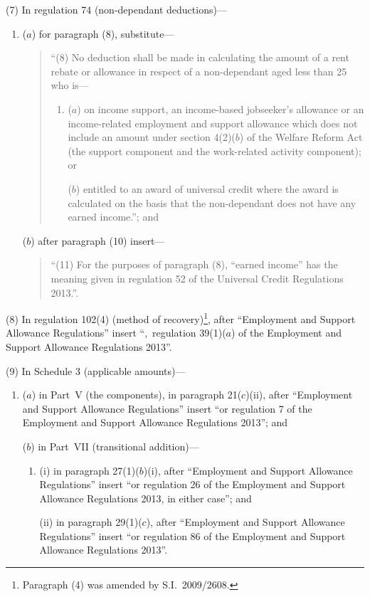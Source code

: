 \documentclass[12pt,a4paper]{article}
\begin{document}
(7) In regulation 74 (non-dependant deductions)—
\begin{enumerate}\item[]
($a$) for paragraph (8), substitute—
\begin{quotation}
“(8) No deduction shall be made in calculating the amount of a rent rebate or allowance in respect of a non-dependant aged less than 25 who is—
\begin{enumerate}\item[]
($a$) on income support, an income-based jobseeker’s allowance or an income-related employment and support allowance which does not include an amount under section 4(2)($b$)  of the Welfare Reform Act (the support component and the work-related activity component); or

($b$) entitled to an award of universal credit where the award is calculated on the basis that the non-dependant does not have any earned income.”; and
\end{enumerate}
\end{quotation}

($b$) after paragraph (10) insert—
\begin{quotation}
“(11) For the purposes of paragraph (8), “earned income” has the meaning given in regulation 52 of the Universal Credit Regulations 2013.”.
\end{quotation}
\end{enumerate}

(8) In regulation 102(4) (method of recovery)\footnote{Paragraph (4) was amended by S.I.~2009/2608.}, after “Employment and Support Allowance Regulations” insert “,~regulation 39(1)($a$)  of the Employment and Support Allowance Regulations 2013”.

(9) In Schedule 3 (applicable amounts)—
\begin{enumerate}\item[]
($a$) in Part~V (the components), in paragraph 21($c$)(ii), after “Employment and Support Allowance Regulations” insert “or regulation 7 of the Employment and Support Allowance Regulations 2013”; and

($b$) in Part~VII (transitional addition)—
\begin{enumerate}\item[]
(i) in paragraph 27(1)($b$)(i), after “Employment and Support Allowance Regulations” insert “or regulation 26 of the Employment and Support Allowance Regulations 2013, in either case”; and

(ii) in paragraph 29(1)($c$), after “Employment and Support Allowance Regulations” insert “or regulation 86 of the Employment and Support Allowance Regulations 2013”.
\end{enumerate}
\end{enumerate}
\end{document}
